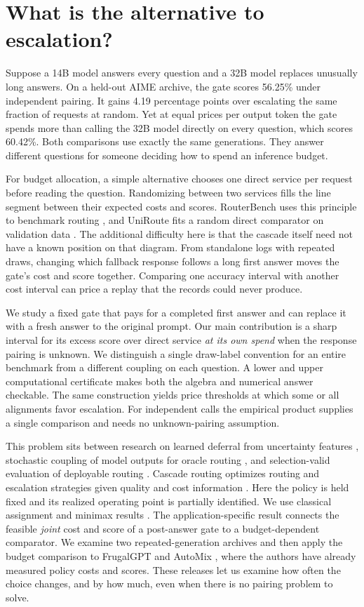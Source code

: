 \section{What is the alternative to escalation?}
Suppose a 14B model answers every question and a 32B model replaces unusually long answers. On a held-out AIME archive, the gate scores 56.25\% under independent pairing. It gains 4.19 percentage points over escalating the same fraction of requests at random. Yet at equal prices per output token the gate spends more than calling the 32B model directly on every question, which scores 60.42\%. Both comparisons use exactly the same generations. They answer different questions for someone deciding how to spend an inference budget.

For budget allocation, a simple alternative chooses one direct service per request before reading the question. Randomizing between two services fills the line segment between their expected costs and scores. RouterBench uses this principle to benchmark routing \cite{routerbench}, and UniRoute fits a random direct comparator on validation data \cite{uniroute}. The additional difficulty here is that the cascade itself need not have a known position on that diagram. From standalone logs with repeated draws, changing which fallback response follows a long first answer moves the gate's cost and score together. Comparing one accuracy interval with another cost interval can price a replay that the records could never produce.

We study a fixed gate that pays for a completed first answer and can replace it with a fresh answer to the original prompt. Our main contribution is a sharp interval for its excess score over direct service \emph{at its own spend} when the response pairing is unknown. We distinguish a single draw-label convention for an entire benchmark from a different coupling on each question. A lower and upper computational certificate makes both the algebra and numerical answer checkable. The same construction yields price thresholds at which some or all alignments favor escalation. For independent calls the empirical product supplies a single comparison and needs no unknown-pairing assumption.

This problem sits between research on learned deferral from uncertainty features \cite{gupta}, stochastic coupling of model outputs for oracle routing \cite{chen1,chen2}, and selection-valid evaluation of deployable routing \cite{shihab}. Cascade routing optimizes routing and escalation strategies given quality and cost information \cite{cascade}. Here the policy is held fixed and its realized operating point is partially identified. We use classical assignment and minimax results \cite{kuhn,sion}. The application-specific result connects the feasible \emph{joint} cost and score of a post-answer gate to a budget-dependent comparator. We examine two repeated-generation archives and then apply the budget comparison to FrugalGPT and AutoMix \cite{frugal,automix}, where the authors have already measured policy costs and scores. These releases let us examine how often the choice changes, and by how much, even when there is no pairing problem to solve.
